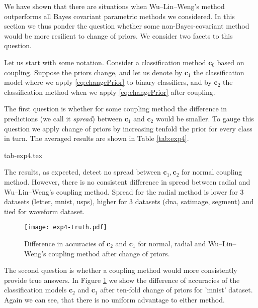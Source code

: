 We have shown that there are situations when Wu--Lin--Weng's method outperforms all Bayes covariant parametric methods we considered. In this section we thus ponder the question whether some non-Bayes-covariant method would be more resilient to change of priors. We consider two facets to this question.

Let us start with some notation. Consider a classification method $\boldsymbol{c}_0$ based on coupling. Suppose the priors change, and let us denote by $\boldsymbol{c}_1$ the classification model where we apply \eqref{eq:changePrior} to binary classifiers, and by $\boldsymbol{c}_2$ the classification method when we apply \eqref{eq:changePrior} after coupling. 

The first question is whether for some coupling method the difference in predictions (we call it \emph{spread}) between $\boldsymbol{c}_1$ and $\boldsymbol{c}_2$ would be smaller. To gauge this question we apply change of priors by increasing tenfold the prior for every class in turn.  The averaged results are shown in Table \ref{tab:exp4}. 

 {tab-exp4.tex}

The results, as expected, detect no spread between $\boldsymbol{c}_1, \boldsymbol{c}_2$ for normal coupling method. However, there is no consistent difference in spread between radial and Wu--Lin--Weng's coupling method. Spread for the radial method is lower for 3 datasets (letter, mnist, usps), higher for 3 datasets (dna, satimage, segment) and tied for waveform dataset.

\begin{figure}[!ht]
	\texttt{[image: exp4-truth.pdf]}
	\caption{Difference in accuracies of $\boldsymbol{c}_2$ and $\boldsymbol{c}_1$ for normal, radial and Wu--Lin--Weng's coupling method after change of priors.}
	\label{fig:score}
\end{figure}


The second question is whether a coupling method would more consistently provide true answers. In Figure \ref{fig:score} we show the difference of accuracies of the classification models $\boldsymbol{c}_2$ and $\boldsymbol{c}_1$ after ten-fold change of priors for 'mnist' dataset. Again we can see, that there is no uniform advantage to either method.


